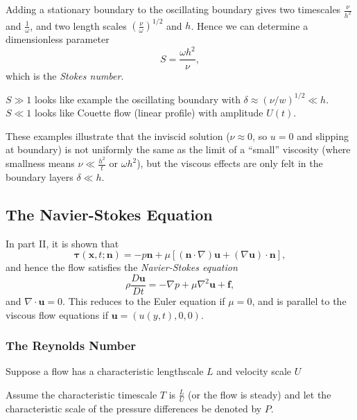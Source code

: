 \documentclass[12pt]{article}
\begin{document}

Adding a stationary boundary to the oscillating boundary gives two timescales $\frac{\nu}{h^2}$ and $\frac{1}{\omega}$, and two length scales $(\frac{\nu}{\omega})^{1/2}$ and $h$. Hence we can determine a dimensionless parameter
\[
S = \frac{\omega h^2}{\nu}
,\]
which is the \emph{Stokes number}.

$S \gg 1$ looks like example the oscillating boundary with $\delta \approx (\nu/w)^{1/2} \ll h$. $S \ll 1$ looks like Couette flow (linear profile) with amplitude $U(t)$.

These examples illustrate that the inviscid solution ($\nu \approx 0$, so $u = 0$ and slipping at boundary) is not uniformly the same as the limit of a ``small'' viscosity (where smallness means $\nu \ll \frac{h^2}{t}$ or $\omega h^2$), but the viscous effects are only felt in the boundary layers $\delta \ll h$.

\subsection{The Navier-Stokes Equation}
\label{sub:the_navier_stokes_equation}

In part II, it is shown that
\[
	\bm{\tau}(\mathbf{x}, t ; \mathbf{n}) = - p \mathbf{n} + \mu[(\mathbf{n} \cdot \nabla) \mathbf{u} + (\nabla \mathbf{u}) \cdot \mathbf{n}],
\]
and hence the flow satisfies the \emph{Navier-Stokes equation}
\[
\rho \frac{D \mathbf{u}}{Dt} = - \nabla p + \mu \nabla^2 \mathbf{u} + \mathbf{f}
,\]
and $\nabla \cdot \mathbf{u} = 0$. This reduces to the Euler equation if $\mu = 0$, and is parallel to the viscous flow equations if $\mathbf{u} = (u(y,t),0,0)$.

\subsubsection{The Reynolds Number}
\label{subsub:the_reynolds_number}

Suppose a flow has a characteristic lengthscale $L$ and velocity scale $U$ 


Assume the characteristic timescale $T$ is $\frac{L}{U}$ (or the flow is steady) and let the characteristic scale of the pressure differences be denoted by $P$.
\end{document}

